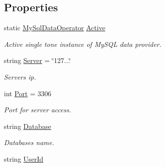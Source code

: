 \subsection*{Properties}
\begin{DoxyCompactItemize}
\item 
static \mbox{\hyperlink{class_uniform_data_operator_1_1_sql_1_1_my_sql_1_1_my_sql_data_operator}{My\+Sql\+Data\+Operator}} \mbox{\hyperlink{class_uniform_data_operator_1_1_sql_1_1_my_sql_1_1_my_sql_data_operator_a8e8f8f936f6a4306dc4dc0d3eb07770c}{Active}}
\begin{DoxyCompactList}\small\item\em Active single tone instance of My\+S\+QL data provider. \end{DoxyCompactList}\item 
string \mbox{\hyperlink{class_uniform_data_operator_1_1_sql_1_1_my_sql_1_1_my_sql_data_operator_a2154fef9e522ef26cf08642483fed223}{Server}} = \char`\"{}127...\char`\"{}
\begin{DoxyCompactList}\small\item\em Server\textquotesingle{}s ip. \end{DoxyCompactList}\item 
int \mbox{\hyperlink{class_uniform_data_operator_1_1_sql_1_1_my_sql_1_1_my_sql_data_operator_a2cfc65d2842491734270dfe114d9eec5}{Port}} = 3306
\begin{DoxyCompactList}\small\item\em Port for server access. \end{DoxyCompactList}\item 
string \mbox{\hyperlink{class_uniform_data_operator_1_1_sql_1_1_my_sql_1_1_my_sql_data_operator_a144616e12acb2b55c7046af0c9af989d}{Database}}
\begin{DoxyCompactList}\small\item\em Database\textquotesingle{}s name. \end{DoxyCompactList}\item 
string \mbox{\hyperlink{class_uniform_data_operator_1_1_sql_1_1_my_sql_1_1_my_sql_data_operator_ae5e119508a6d9807b9e138c628a6e18f}{User\+Id}}

\end{DoxyCompactItemize}
